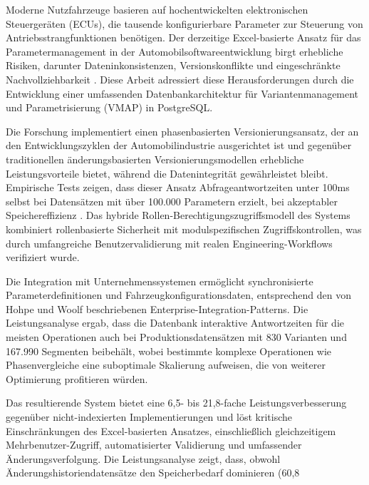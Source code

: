 Moderne Nutzfahrzeuge basieren auf hochentwickelten elektronischen Steuergeräten (ECUs), die tausende konfigurierbare Parameter zur Steuerung von Antriebsstrangfunktionen benötigen. Der derzeitige Excel-basierte Ansatz für das Parametermanagement in der Automobilsoftwareentwicklung birgt erhebliche Risiken, darunter Dateninkonsistenzen, Versionskonflikte und eingeschränkte Nachvollziehbarkeit \cite{trovao2024evolution}. Diese Arbeit adressiert diese Herausforderungen durch die Entwicklung einer umfassenden Datenbankarchitektur für Variantenmanagement und Parametrisierung (VMAP) in PostgreSQL.
	
Die Forschung implementiert einen phasenbasierten Versionierungsansatz, der an den Entwicklungszyklen der Automobilindustrie ausgerichtet ist und gegenüber traditionellen änderungsbasierten Versionierungsmodellen erhebliche Leistungsvorteile bietet, während die Datenintegrität gewährleistet bleibt. Empirische Tests zeigen, dass dieser Ansatz Abfrageantwortzeiten unter 100ms selbst bei Datensätzen mit über 100.000 Parametern erzielt, bei akzeptabler Speichereffizienz \cite{bhattacherjee2015principles}. Das hybride Rollen-Berechtigungszugriffsmodell des Systems kombiniert rollenbasierte Sicherheit mit modulspezifischen Zugriffskontrollen, was durch umfangreiche Benutzervalidierung mit realen Engineering-Workflows verifiziert wurde.
	
Die Integration mit Unternehmenssystemen ermöglicht synchronisierte Parameterdefinitionen und Fahrzeugkonfigurationsdaten, entsprechend den von Hohpe und Woolf \cite{hohpe2002enterprise} beschriebenen Enterprise-Integration-Patterns. Die Leistungsanalyse ergab, dass die Datenbank interaktive Antwortzeiten für die meisten Operationen auch bei Produktionsdatensätzen mit 830 Varianten und 167.990 Segmenten beibehält, wobei bestimmte komplexe Operationen wie Phasenvergleiche eine suboptimale Skalierung aufweisen, die von weiterer Optimierung profitieren würden.
	
Das resultierende System bietet eine 6,5- bis 21,8-fache Leistungsverbesserung gegenüber nicht-indexierten Implementierungen und löst kritische Einschränkungen des Excel-basierten Ansatzes, einschließlich gleichzeitigem Mehrbenutzer-Zugriff, automatisierter Validierung und umfassender Änderungsverfolgung. Die Leistungsanalyse zeigt, dass, obwohl Änderungshistoriendatensätze den Speicherbedarf dominieren (60,8%









\newpage
\makeatletter
	\if@twoside%
   		\cleardoublepage
   		
	\else%
	\fi%
\makeatother